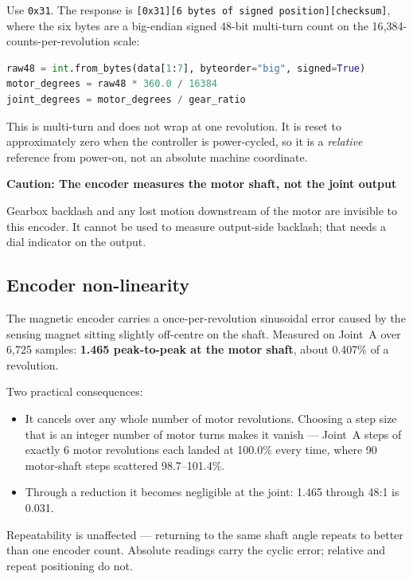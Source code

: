 \documentclass[11pt,letterpaper]{article}
\newenvironment{caution}[1]{%
    \par\addvspace{8pt}%
    \noindent{\color{cautionred}\rule{\linewidth}{0.8pt}}\par\vspace{2pt}
    \noindent\textbf{\color{cautionred}Caution: #1}\par\vspace{2pt}
}{%
    \par\vspace{2pt}\noindent{\color{cautionred}\rule{\linewidth}{0.4pt}}%
    \par\addvspace{8pt}%
}
\begin{document}
Use \texttt{0x31}. The response is
\texttt{[0x31][6 bytes of signed position][checksum]}, where the six bytes are a
big-endian signed 48-bit multi-turn count on the 16{,}384-counts-per-revolution
scale:

\begin{lstlisting}[language=python, caption=Verified position extraction]
raw48 = int.from_bytes(data[1:7], byteorder="big", signed=True)
motor_degrees = raw48 * 360.0 / 16384
joint_degrees = motor_degrees / gear_ratio
\end{lstlisting}

This is multi-turn and does not wrap at one revolution. It is reset to approximately
zero when the controller is power-cycled, so it is a \emph{relative} reference from
power-on, not an absolute machine coordinate.

\begin{caution}{The encoder measures the motor shaft, not the joint output}
Gearbox backlash and any lost motion downstream of the motor are invisible to this
encoder. It cannot be used to measure output-side backlash; that needs a dial
indicator on the output.
\end{caution}

\subsection{Encoder non-linearity}
The magnetic encoder carries a once-per-revolution sinusoidal error caused by the
sensing magnet sitting slightly off-centre on the shaft. Measured on Joint~A over
6{,}725 samples: \textbf{1.465\textdegree{} peak-to-peak at the motor shaft}, about
0.407\% of a revolution.

Two practical consequences:
\begin{itemize}
    \item It cancels over any whole number of motor revolutions. Choosing a step
          size that is an integer number of motor turns makes it vanish --- Joint~A
          steps of exactly 6 motor revolutions each landed at 100.0\% every time,
          where 90\textdegree{} motor-shaft steps scattered 98.7--101.4\%.
    \item Through a reduction it becomes negligible at the joint: 1.465\textdegree{}
          through 48:1 is 0.031\textdegree{}.
\end{itemize}
Repeatability is unaffected --- returning to the same shaft angle repeats to better
than one encoder count. Absolute readings carry the cyclic error; relative and
repeat positioning do not.
\end{document}
